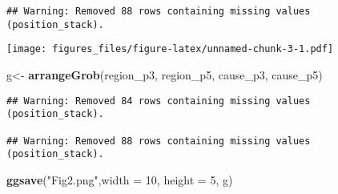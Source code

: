 \documentclass[
]{article}
\newenvironment{Shaded}{\begin{snugshade}}{\end{snugshade}}
\newcommand{\DataTypeTok}[1]{\textcolor[rgb]{0.13,0.29,0.53}{#1}}
\newcommand{\DecValTok}[1]{\textcolor[rgb]{0.00,0.00,0.81}{#1}}
\newcommand{\KeywordTok}[1]{\textcolor[rgb]{0.13,0.29,0.53}{\textbf{#1}}}
\newcommand{\NormalTok}[1]{#1}
\newcommand{\StringTok}[1]{\textcolor[rgb]{0.31,0.60,0.02}{#1}}
\begin{document}
\begin{verbatim}
## Warning: Removed 88 rows containing missing values (position_stack).
\end{verbatim}

\texttt{[image: figures\_files/figure-latex/unnamed-chunk-3-1.pdf]}

\begin{Shaded}
\begin{Highlighting}[]
\NormalTok{g<-}\StringTok{ }\KeywordTok{arrangeGrob}\NormalTok{(region_p3, region_p5, cause_p3, cause_p5)}
\end{Highlighting}
\end{Shaded}

\begin{verbatim}
## Warning: Removed 84 rows containing missing values (position_stack).

## Warning: Removed 88 rows containing missing values (position_stack).
\end{verbatim}

\begin{Shaded}
\begin{Highlighting}[]
\KeywordTok{ggsave}\NormalTok{(}\StringTok{"Fig2.png"}\NormalTok{,}\DataTypeTok{width =} \DecValTok{10}\NormalTok{, }\DataTypeTok{height =} \DecValTok{5}\NormalTok{, g)}
\end{Highlighting}
\end{Shaded}
\end{document}
